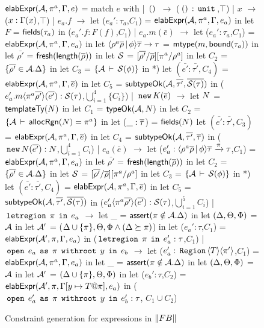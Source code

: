 \begin{figure}

\begin{codeml}
${\sf elabExpr}({\mathcal{A}},\pi^a,\Gamma,e)$ = 
  match $e$ with
  | $\,{\tt ()}\,$ $\longrightarrow$ ($\,{\tt ()}\,:\,{\tt unit}\,$,$\top$)
  | $x$ $\longrightarrow$ ($x:\Gamma(x)$,$\top$)
  | $e_a.f$ $\longrightarrow$ 
    let ($e_a':\tau_a$,$C_1$) = ${\sf elabExpr}({\mathcal{A}},\pi^a,\Gamma,e_a)$ in
    let $F$ = ${\sf fields}(\tau_a)$ in
      ($e_a'.f:F(f)$,$C_1$)
  | $e_a.m(\bar{e})$ $\longrightarrow$ 
    let ($e_a':\tau_a$,$C_1$) = ${\sf elabExpr}({\mathcal{A}},\pi^a,\Gamma,e_a)$ in
    let $\langle \rho^a\overline{\rho}\,|\,\phi \rangle\overline{\tau} \rightarrow \tau$ = ${\sf mtype}(m,{\sf bound}(\tau_a))$ in
    let $\bar{\rho'}$ = ${\sf fresh}({\sf length}(\overline{\rho}))$ in
    let $\mathcal{S}$ = $[\overline{\rho'}/\overline{\rho}][\pi^a/\rho^a]$ in
    let $C_2$ = $\{\overline{\rho'} \in {\mathcal{A}}.\Delta\}$ in
    let $C_3$ = $\{{\mathcal{A}}\,\vdash\,\mathcal{S}(\phi)\}$ in
*)   let $(\bar{e'}:\bar{\tau'}, C_4)$ = ${\sf elabExpr}({\mathcal{A}},\pi^a,\Gamma,\overline{e})$ in
    let $C_5$ = ${\sf subtypeOk}({{\mathcal{A}}},{\overline{\tau'}},{\overline{\mathcal{S}(\tau)}})$ in
      ($e_a'.m\langle \pi^a\overline{\rho'} \rangle(\overline{e'}):\mathcal{S}(\tau)$,$\bigcup_{i=1}^4 \{C_i\}$)
  | $\,{\tt new}\, K(\overline{e})$ $\longrightarrow$ 
    let $N$ = ${\sf templateTy}(N)$ in
    let $C_1$ = ${\sf typeOk}({{\mathcal{A}}},{N})$ in
    let $C_2$ = $\{{\mathcal{A}}\,\vdash\,{\sf allocRgn}(N)=\pi^a\}$ in
    let ($\_:\overline{\tau}$) = ${\sf fields}(N)$
    let $(\bar{e'}:\bar{\tau'}, C_3)$ = ${\sf elabExpr}({\mathcal{A}},\pi^a,\Gamma,\overline{e})$ in
    let $C_4$ = ${\sf subtypeOk}({{\mathcal{A}}},{\overline{\tau'}},{\overline{\tau}})$ in
      ($\,{\tt new}\, N(\overline{e'}) : N$,$\bigcup_{i=1}^4 C_i$)
  | $e_a(\bar{e})$ $\longrightarrow$ 
    let ($e_a':\langle \rho^a\overline{\rho}\,|\,\phi \rangle\overline{\tau} \xrightarrow{\pi} \tau$,$C_1$) = 
                ${\sf elabExpr}({\mathcal{A}},\pi^a,\Gamma,e_a)$ in
    let $\bar{\rho'}$ = ${\sf fresh}({\sf length}(\overline{\rho}))$ in
    let $C_2$ = $\{\overline{\rho'} \in {\mathcal{A}}.\Delta\}$ in
    let $\mathcal{S}$ = $[\overline{\rho'}/\overline{\rho}][\pi^a/\rho^a]$ in
    let $C_3$ = $\{{\mathcal{A}}\,\vdash\,\mathcal{S}(\phi)\}$ in
*)   let $(\bar{e'}:\bar{\tau'}, C_4)$ = ${\sf elabExpr}({\mathcal{A}},\pi^a,\Gamma,\overline{e})$ in
    let $C_5$ = ${\sf subtypeOk}({{\mathcal{A}}},{\overline{\tau'}},{\overline{\mathcal{S}(\tau)}})$ in
      ($e_a'\langle \pi^a\overline{\rho'} \rangle(\overline{e'}):\mathcal{S}(\tau)$,$\bigcup_{i=1}^5 C_i$)
  | $\,{\tt letregion}\,\;\pi\;\,{\tt in}\,\;e_a$ $\longrightarrow$
    let _ = ${\sf assert}(\pi \notin {\mathcal{A}}.\Delta)$ in
    let $(\Delta,\Theta,\Phi)$ = ${\mathcal{A}}$ in
    let ${\mathcal{A}}'$ = ($\Delta \cup \{\pi\}, \Theta, \Phi \wedge (\Delta \succeq \pi)$) in
    let ($e_a':\tau$,$C_1$) = ${\sf elabExpr}({\mathcal{A}}',\pi,\Gamma,e_a)$ in
      ($\,{\tt letregion}\,\;\pi\;\,{\tt in}\,\;e_a':\tau$,$C_1$)
  | $\,{\tt open}\,\;e_a\;\,{\tt as}\,\;\pi\;\,{\tt withroot}\,\;y\;\,{\tt in}\,\;e_b$ $\longrightarrow$ 
    let ($e_a':\,{\tt Region}\,\langle T \rangle\langle \pi' \rangle$,$C_1$) = 
                ${\sf elabExpr}({\mathcal{A}},\pi^a,\Gamma,e_a)$ in
    let _ = ${\sf assert}(\pi \notin {\mathcal{A}}.\Delta)$ in
    let $(\Delta,\Theta,\Phi)$ = ${\mathcal{A}}$ in
    let ${\mathcal{A}}'$ = $(\Delta \cup \{\pi\},\Theta,\Phi)$ in
    let ($e_b':\tau$,$C_2$) = ${\sf elabExpr}({\mathcal{A}}',\pi,\Gamma[y\mapsto T@\pi],e_a)$ in
      ($\,{\tt open}\,\;e_a'\;\,{\tt as}\,\;\pi\;\,{\tt withroot}\,\;y\;\,{\tt in}\,\;e_b' : \tau$, $C_1 \cup C_2$)
\end{codeml}

\caption{Constraint generation for expressions in $\left\| {\sc FB} \right\|$}
\label{fig:fb-constraintgen}
\end{figure}
